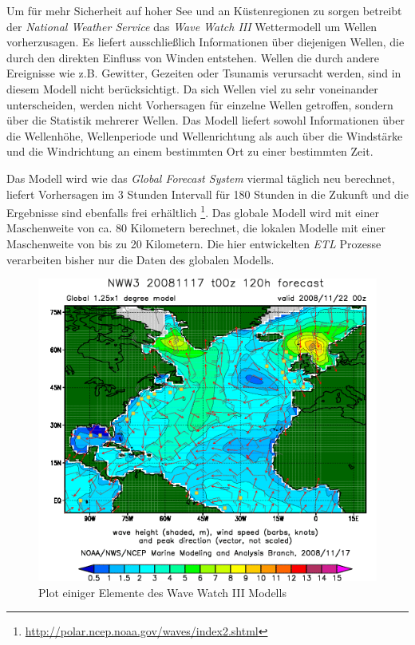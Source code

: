 Um für mehr Sicherheit auf hoher See und an Küstenregionen zu sorgen
betreibt der \textit{National Weather Service} das \textit{Wave Watch
  III} Wettermodell um Wellen vorherzusagen. Es liefert ausschließlich
Informationen über diejenigen Wellen, die durch den direkten Einfluss
von Winden entstehen. Wellen die durch andere Ereignisse wie
z.B. Gewitter, Gezeiten oder Tsunamis verursacht werden, sind in
diesem Modell nicht berücksichtigt. Da sich Wellen viel zu sehr
voneinander unterscheiden, werden nicht Vorhersagen für einzelne
Wellen getroffen, sondern über die Statistik mehrerer Wellen. Das
Modell liefert sowohl Informationen über die Wellenhöhe, Wellenperiode
und Wellenrichtung als auch über die Windstärke und die Windrichtung
an einem bestimmten Ort zu einer bestimmten Zeit.

Das Modell wird wie das \textit{Global Forecast System} viermal
täglich neu berechnet, liefert Vorhersagen im 3 Stunden Intervall für
180 Stunden in die Zukunft und die Ergebnisse sind ebenfalls frei
erhältlich
\footnote{\url{http://polar.ncep.noaa.gov/waves/index2.shtml}}. Das
globale Modell wird mit einer Maschenweite von ca. 80 Kilometern
berechnet, die lokalen Modelle mit einer Maschenweite von bis zu 20
Kilometern. Die hier entwickelten \textit{ETL} Prozesse verarbeiten
bisher nur die Daten des globalen Modells.

\begin{figure}[h]
  \begin{center}
    \includegraphics[width=\textwidth]{bilder/wave-watch}
    \caption{Plot einiger Elemente des Wave Watch III Modells}
    \label{wave-watch-grads}
  \end{center}
\end{figure}

